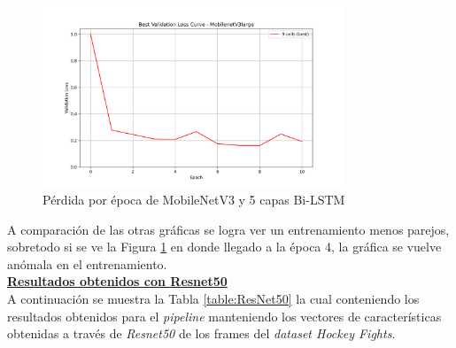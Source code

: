 \begin{figure}[h!] 
    \includegraphics[width=0.8\textwidth]{../graphs/MobileNetV3large_best_val_loss.png}
    \centering 
    \caption{Pérdida por época de MobileNetV3 y 5 capas Bi-LSTM } 
    \label{MobileNetV3Loss} 
\end{figure}

A comparación de las otras gráficas se logra ver un entrenamiento menos 
parejos, sobretodo si se ve la Figura \ref{MobileNetV3Loss} en donde 
llegado a la época 4, la gráfica se vuelve anómala en el entrenamiento. \\

\textbf{\underline{Resultados obtenidos con Resnet50}}\\

A continuación se muestra la Tabla  \ref{table:ResNet50} 
la cual conteniendo los resultados obtenidos para el 
\textit{pipeline} manteniendo los vectores de características 
obtenidas a través de \textit{Resnet50} de los frames del 
\textit{dataset Hockey Fights}.\\

